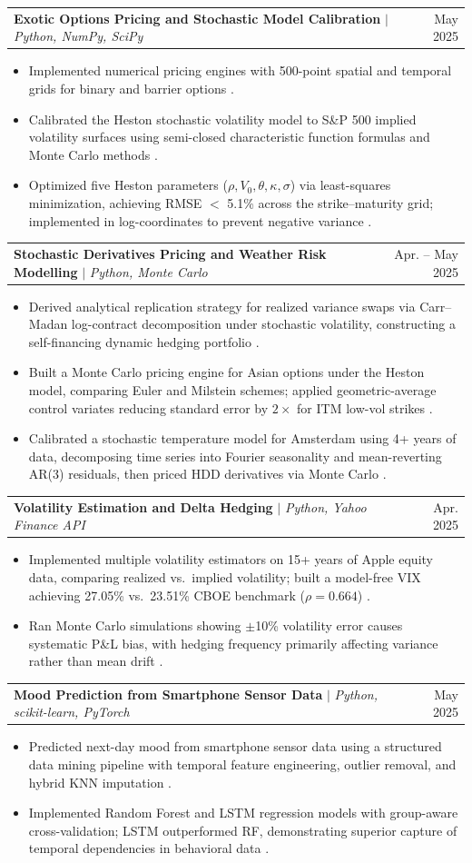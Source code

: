 \documentclass[letterpaper,11pt]{article}
\makeatletter
\newcommand{\resumeItem}[1]{
  \item\small{
    {#1 \vspace{-2pt}}
  }
}
\newcommand{\resumeProjectHeading}[2]{
    \item
    \begin{tabular*}{0.97\textwidth}{l@{\extracolsep{\fill}}r}
      \small#1 & #2 \\
    \end{tabular*}\vspace{-7pt}
}
\newcommand{\resumeItemListStart}{\begin{itemize}}
\newcommand{\resumeItemListEnd}{\end{itemize}\vspace{-5pt}}
\makeatother
\begin{document}
      \resumeProjectHeading
          {\textbf{Exotic Options Pricing and Stochastic Model Calibration} $|$ \emph{Python, NumPy, SciPy}}{May 2025}
          \resumeItemListStart
            \resumeItem{Implemented numerical pricing engines with 500-point spatial and temporal grids for binary and barrier options .}
            \resumeItem{Calibrated the Heston stochastic volatility model to S\&P 500 implied volatility surfaces using semi-closed characteristic function formulas and Monte Carlo methods .}
            \resumeItem{Optimized five Heston parameters ($\rho, V_0, \theta, \kappa, \sigma$) via least-squares minimization, achieving RMSE $<$ 5.1\% across the strike--maturity grid; implemented in log-coordinates to prevent negative variance .}
          \resumeItemListEnd

      \resumeProjectHeading
          {\textbf{Stochastic Derivatives Pricing and Weather Risk Modelling} $|$ \emph{Python, Monte Carlo}}{Apr. -- May 2025}
          \resumeItemListStart
            \resumeItem{Derived analytical replication strategy for realized variance swaps via Carr--Madan log-contract decomposition under stochastic volatility, constructing a self-financing dynamic hedging portfolio .}
            \resumeItem{Built a Monte Carlo pricing engine for Asian options under the Heston model, comparing Euler and Milstein schemes; applied geometric-average control variates reducing standard error by $2\times$ for ITM low-vol strikes .}
            \resumeItem{Calibrated a stochastic temperature model for Amsterdam using 4+ years of data, decomposing time series into Fourier seasonality and mean-reverting AR(3) residuals, then priced HDD derivatives via Monte Carlo .}
          \resumeItemListEnd

      \resumeProjectHeading
          {\textbf{Volatility Estimation and Delta Hedging} $|$ \emph{Python, Yahoo Finance API}}{Apr. 2025}
          \resumeItemListStart
            \resumeItem{Implemented multiple volatility estimators on 15+ years of Apple equity data, comparing realized vs.\ implied volatility; built a model-free VIX achieving 27.05\% vs.\ 23.51\% CBOE benchmark ($\rho=0.664$) .}
            \resumeItem{Ran Monte Carlo simulations showing $\pm$10\% volatility error causes systematic P\&L bias, with hedging frequency primarily affecting variance rather than mean drift .}
          \resumeItemListEnd

      \resumeProjectHeading
          {\textbf{Mood Prediction from Smartphone Sensor Data} $|$ \emph{Python, scikit-learn, PyTorch}}{May 2025}
          \resumeItemListStart
            \resumeItem{Predicted next-day mood from smartphone sensor data using a structured data mining pipeline with temporal feature engineering, outlier removal, and hybrid KNN imputation .}
            \resumeItem{Implemented Random Forest and LSTM regression models with group-aware cross-validation; LSTM outperformed RF, demonstrating superior capture of temporal dependencies in behavioral data .}
          \resumeItemListEnd
\end{document}
